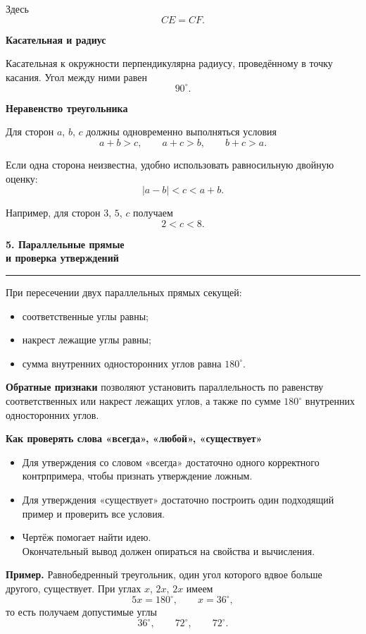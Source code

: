 \documentclass[a4paper,12pt]{article}
\newcommand{\Section}[1]{%
  \Needspace{5\baselineskip}%
  \vspace{0.6em}%
  {\Large\bfseries\color{darkaccent}#1}\par
  \vspace{0.2em}%
  {\color{accent}\rule{0.14\linewidth}{1.2pt}}\par
  \vspace{0.4em}%
}
\newcommand{\Subsection}[1]{%
  \Needspace{3\baselineskip}%
  \vspace{0.45em}%
  {\large\bfseries\color{darkaccent}#1}\par
  \vspace{0.15em}%
}
\newcommand{\Key}[1]{\textbf{\color{darkaccent}#1}}
\newcommand{\degree}{^{\circ}}
\begin{document}
Здесь
\[
  CE=CF.
\]

\Subsection{Касательная и радиус}

Касательная к окружности перпендикулярна радиусу, проведённому в точку
касания. Угол между ними равен
\[
  90\degree.
\]

\clearpage

\Subsection{Неравенство треугольника}

Для сторон $a$, $b$, $c$ должны одновременно выполняться условия
\[
  a+b>c,
  \qquad
  a+c>b,
  \qquad
  b+c>a.
\]

Если одна сторона неизвестна, удобно использовать равносильную двойную оценку:
\[
  |a-b|<c<a+b.
\]

Например, для сторон $3$, $5$, $c$ получаем
\[
  2<c<8.
\]

\Section{5. Параллельные прямые\\и проверка утверждений}

При пересечении двух параллельных прямых секущей:

\begin{itemize}
  \item соответственные углы равны;
  \item накрест лежащие углы равны;
  \item сумма внутренних односторонних углов равна $180\degree$.
\end{itemize}

\Key{Обратные признаки}
позволяют установить параллельность по равенству соответственных или
накрест лежащих углов, а также по сумме $180\degree$
внутренних односторонних углов.

\Subsection{Как проверять слова «всегда», «любой», «существует»}

\begin{itemize}
  \item
  Для утверждения со словом «всегда» достаточно одного корректного
  контрпримера, чтобы признать утверждение ложным.

  \item
  Для утверждения «существует» достаточно построить один подходящий
  пример и проверить все условия.

  \item
  Чертёж помогает найти идею.\\
  Окончательный вывод должен опираться на свойства и вычисления.
\end{itemize}

\Key{Пример.}
Равнобедренный треугольник, один угол которого вдвое больше другого,
существует. При углах $x$, $2x$, $2x$ имеем
\[
  5x=180\degree,
  \qquad
  x=36\degree,
\]
то есть получаем допустимые углы
\[
  36\degree,\qquad72\degree,\qquad72\degree.
\]
\end{document}
